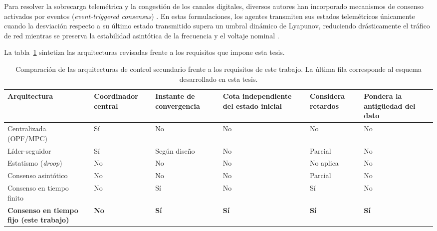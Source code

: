 Para resolver la sobrecarga telemétrica y la congestión de los canales digitales, diversos autores han incorporado mecanismos de consenso activados por eventos (\textit{event-triggered consensus}) \citep{Chen2024}. En estas formulaciones, los agentes transmiten sus estados telemétricos únicamente cuando la desviación respecto a su último estado transmitido supera un umbral dinámico de Lyapunov, reduciendo drásticamente el tráfico de red mientras se preserva la estabilidad asintótica de la frecuencia y el voltaje nominal \citep{Liu2024, AlTameemi2024}.

La tabla~\ref{tab:comparacion_control} sintetiza las arquitecturas revisadas frente a los requisitos que impone esta tesis.

\begin{table}[H]
    \centering
    \footnotesize
    \begin{tabularx}{\textwidth}{|>{\raggedright\arraybackslash}p{3.0cm}|>{\centering\arraybackslash}X|>{\centering\arraybackslash}X|>{\centering\arraybackslash}X|>{\centering\arraybackslash}X|>{\centering\arraybackslash}X|}
        \hline
        \textbf{Arquitectura} & \textbf{Coordinador central} & \textbf{Instante de convergencia} & \textbf{Cota independiente del estado inicial} & \textbf{Considera retardos} & \textbf{Pondera la antigüedad del dato} \\
        \hline
        Centralizada (OPF/MPC) \citep{Khayat2020, Guo2026} & Sí & No & No & No & No \\
        \hline
        Líder-seguidor \citep{Guo2026} & Sí & Según diseño & No & Parcial & No \\
        \hline
        Estatismo (\textit{droop}) \citep{Khayat2020} & No & No & No & No aplica & No \\
        \hline
        Consenso asintótico \citep{SimpsonPorco2015} & No & No & No & Parcial & No \\
        \hline
        Consenso en tiempo finito \citep{Ning2021, Shrivastava2023FiniteTime} & No & Sí & No & Sí & No \\
        \hline
        \textbf{Consenso en tiempo fijo (este trabajo) \citep{Polyakov2012, Huang2023}} & \textbf{No} & \textbf{Sí} & \textbf{Sí} & \textbf{Sí} & \textbf{Sí} \\
        \hline
    \end{tabularx}
    \caption{Comparación de las arquitecturas de control secundario frente a los requisitos de este trabajo. La última fila corresponde al esquema desarrollado en esta tesis.}
    \label{tab:comparacion_control}
\end{table}

